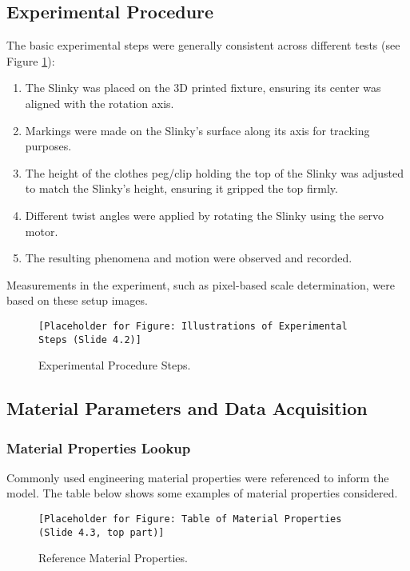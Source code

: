 \documentclass{mcmthesis}  %
\begin{document}
\subsection{Experimental Procedure}
The basic experimental steps were generally consistent across different tests (see Figure \ref{fig:exp_procedure_steps}):
\begin{enumerate}
    \item The Slinky was placed on the 3D printed fixture, ensuring its center was aligned with the rotation axis.
    \item Markings were made on the Slinky's surface along its axis for tracking purposes.
    \item The height of the clothes peg/clip holding the top of the Slinky was adjusted to match the Slinky's height, ensuring it gripped the top firmly.
    \item Different twist angles were applied by rotating the Slinky using the servo motor.
    \item The resulting phenomena and motion were observed and recorded.
\end{enumerate}
Measurements in the experiment, such as pixel-based scale determination, were based on these setup images.

\begin{figure}[h!]
    \centering
    \texttt{[Placeholder for Figure: Illustrations of Experimental Steps (Slide 4.2)]}
    \caption{Experimental Procedure Steps.}
    \label{fig:exp_procedure_steps}
\end{figure}

\subsection{Material Parameters and Data Acquisition}

\subsubsection{Material Properties Lookup}
Commonly used engineering material properties were referenced to inform the model. The table below shows some examples of material properties considered.

\begin{figure}[h!]
    \centering
    \texttt{[Placeholder for Figure: Table of Material Properties (Slide 4.3, top part)]}
    \caption{Reference Material Properties.}
    \label{fig:material_properties_table}
\end{figure}
\end{document}

